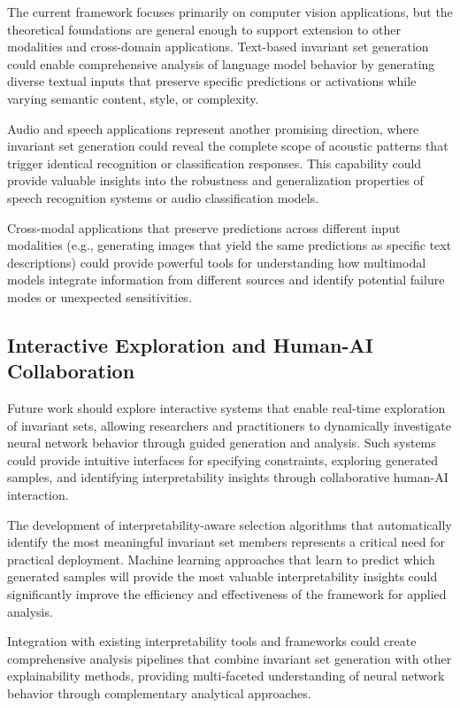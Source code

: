 The current framework focuses primarily on computer vision applications, but the theoretical foundations are general enough to support extension to other modalities and cross-domain applications. Text-based invariant set generation could enable comprehensive analysis of language model behavior by generating diverse textual inputs that preserve specific predictions or activations while varying semantic content, style, or complexity.

Audio and speech applications represent another promising direction, where invariant set generation could reveal the complete scope of acoustic patterns that trigger identical recognition or classification responses. This capability could provide valuable insights into the robustness and generalization properties of speech recognition systems or audio classification models.

Cross-modal applications that preserve predictions across different input modalities (e.g., generating images that yield the same predictions as specific text descriptions) could provide powerful tools for understanding how multimodal models integrate information from different sources and identify potential failure modes or unexpected sensitivities.

\subsection{Interactive Exploration and Human-AI Collaboration}

Future work should explore interactive systems that enable real-time exploration of invariant sets, allowing researchers and practitioners to dynamically investigate neural network behavior through guided generation and analysis. Such systems could provide intuitive interfaces for specifying constraints, exploring generated samples, and identifying interpretability insights through collaborative human-AI interaction.

The development of interpretability-aware selection algorithms that automatically identify the most meaningful invariant set members represents a critical need for practical deployment. Machine learning approaches that learn to predict which generated samples will provide the most valuable interpretability insights could significantly improve the efficiency and effectiveness of the framework for applied analysis.

Integration with existing interpretability tools and frameworks could create comprehensive analysis pipelines that combine invariant set generation with other explainability methods, providing multi-faceted understanding of neural network behavior through complementary analytical approaches.

